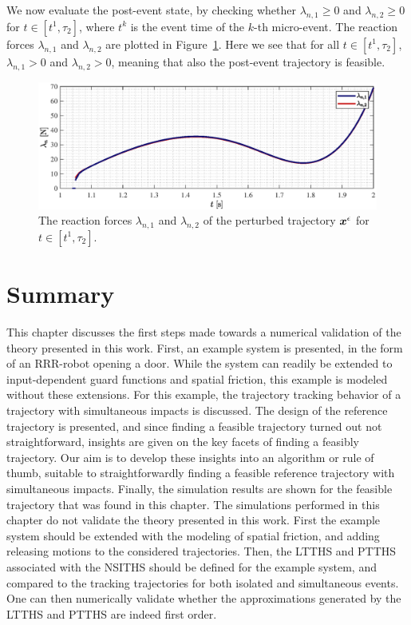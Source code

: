 \documentclass[../DC2019003Bouma.tex]{subfiles}
\begin{document}
We now evaluate the post-event state, by checking whether $\lambda_{n,1}\geq 0$ and $\lambda_{n,2}\geq 0$ for $t\in [t^1,\tau_2]$, where $t^k$ is the event time of the $k$-th micro-event. The reaction forces $\lambda_{n,1}$ and $\lambda_{n,2}$ are plotted in Figure~\ref{fig:5lambda}. Here we see that for all $t\in [t^1,\tau_2]$, $\lambda_{n,1}> 0$ and $\lambda_{n,2}> 0$, meaning that also the post-event trajectory is feasible.

\begin{figure}[h!]
\centering
\includegraphics[width=.8\textwidth]{lambda.eps}\caption{The reaction forces $\lambda_{n,1}$ and $\lambda_{n,2}$ of the perturbed trajectory ${\boldsymbol{x}}^\epsilon$ for $t\in [t^1,\tau_2]$.}\label{fig:5lambda}
\end{figure}

\section{Summary}
This chapter discusses the first steps made towards a numerical validation of the theory presented in this work. First, an example system is presented, in the form of an RRR-robot opening a door. While the system can readily be extended to input-dependent guard functions and spatial friction, this example is modeled without these extensions. For this example, the trajectory tracking behavior of a trajectory with simultaneous impacts is discussed. The design of the reference trajectory is presented, and since finding a feasible trajectory turned out not straightforward, insights are given on the key facets of finding a feasibly trajectory. Our aim is to develop these insights into an algorithm or rule of thumb, suitable to straightforwardly finding a feasible reference trajectory with simultaneous impacts. Finally, the simulation results are shown for the feasible trajectory that was found in this chapter. The simulations performed in this chapter do not validate the theory presented in this work. First the example system should be extended with the modeling of spatial friction, and adding releasing motions to the considered trajectories. Then, the LTTHS and PTTHS associated with the NSITHS should be defined for the example system, and compared to the tracking trajectories for both isolated and simultaneous events. One can then numerically validate whether the approximations generated by the LTTHS and PTTHS are indeed first order.
\end{document}
